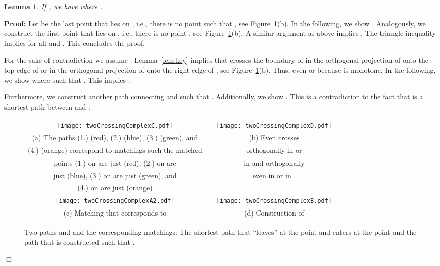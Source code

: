 \documentclass[a4paper,11pt]{article}
\newtheorem{lemma}{Lemma}
\newenvironment{proof}{\textbf{Proof:}}{\hspace*{0mm}\hfill\ensuremath{\Box}}
\begin{document}
\begin{lemma}\label{lem:twoCrossingComplex}
	If ,  we have  where .
\end{lemma}
\begin{proof} Let  be the last point that lies on , i.e., there is no point  such that , see Figure~\ref{fig:twoCrossingComplex}(b). In the following, we show . Analogously, we construct the first point  that lies on , i.e., there is no point , see Figure~\ref{fig:twoCrossingComplex}(b). A similar argument as above implies . The triangle inequality implies  for all  and . This concludes the proof.

	For the sake of contradiction we assume . Lemma~\ref{lem:key} implies that  crosses the boundary  of  in the orthogonal projection  of  onto the top edge of  or in the orthogonal projection  of  onto the right edge of , see Figure~\ref{fig:twoCrossingComplex}(b). Thus, even  or  because  is monotone. In the following, we show  where  such that . This implies . 
		
	Furthermore, we construct another path  connecting  and  such that . Additionally, we show . This is a contradiction to the fact that  is a shortest path between  and :
		
	
\begin{figure}[ht]
  \begin{center}
    \begin{tabular}{ccccccc}
      \texttt{[image: twoCrossingComplexC.pdf]} & &
       \texttt{[image: twoCrossingComplexD.pdf]}&&\\ 
{\small (a) The paths (1.)  (red), (2.)  (blue), (3.)  (green), and } & &
      {\small (b) Even  crosses }&&\\
      {\small (4.)  (orange) correspond to matchings such the matched}& &
      {\small orthogonally in  or}&&\\
      {\small points (1.) on  are just  (red), (2.) on  are}&&
      {\small in  and  orthogonally }&&\\
      {\small just  (blue), (3.) on  are just  (green), and }&&
      {\small even in  or in .}\\
      {\small (4.) on  are just  (orange)}&&
      {\small }\\
      \texttt{[image: twoCrossingComplexA2.pdf]} & &
       \texttt{[image: twoCrossingComplexB.pdf]}&&\\ 
{\small (c) Matching that corresponds to } & &
      {\small (d) Construction of }&&\\
    \end{tabular}
  \end{center}
  \vspace*{-12pt}
  \caption{Two paths  and  and the corresponding matchings: The shortest path  that ``leaves''  at the point  and enters  at the point  and the path  that is constructed such that .}
  \label{fig:twoCrossingComplex}
\end{figure}


\end{proof}
\end{document}
